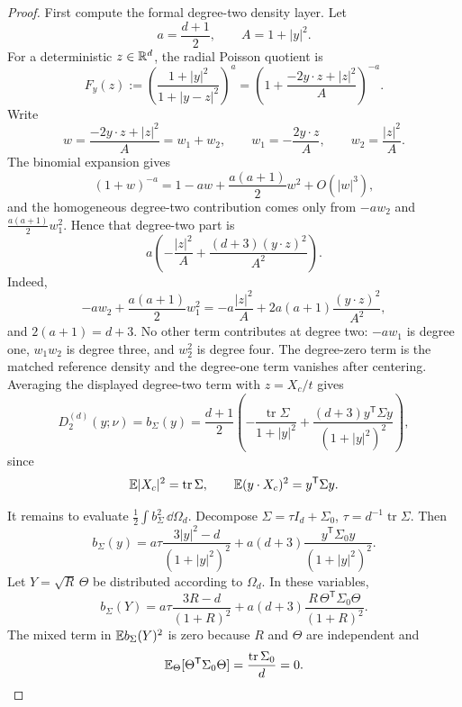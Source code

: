 \ifdefined\JFAArticleMain
{}
\else
\begin{proof}
First compute the formal degree-two density layer.  Let
\[
  a=\frac{d+1}{2},\qquad A=1+|y|^2 .
\]
For a deterministic \(z\in\mathbb{R}^d\), the radial Poisson quotient is
\[
F_y(z):=
\left(\frac{1+|y|^2}{1+|y-z|^2}\right)^a
=
\left(1+\frac{-2y\cdot z+|z|^2}{A}\right)^{-a}.
\]
Write
\[
  w=\frac{-2y\cdot z+|z|^2}{A}=w_1+w_2,\qquad
  w_1=-\frac{2y\cdot z}{A},\qquad
  w_2=\frac{|z|^2}{A}.
\]
The binomial expansion gives
\[
  (1+w)^{-a}=1-aw+\frac{a(a+1)}2w^2+O(|w|^3),
\]
and the homogeneous degree-two contribution comes only from \(-aw_2\) and
\(\frac{a(a+1)}2w_1^2\).  Hence that degree-two part is
\[
a\left(-\frac{|z|^2}{A}
+\frac{(d+3)(y\cdot z)^2}{A^2}\right).
\]
Indeed,
\[
  -aw_2+\frac{a(a+1)}2w_1^2
  =
  -a\frac{|z|^2}{A}
  +2a(a+1)\frac{(y\cdot z)^2}{A^2},
\]
and \(2(a+1)=d+3\).  No other term contributes at degree two:
\(-aw_1\) is degree one, \(w_1w_2\) is degree three, and \(w_2^2\) is degree
four.  The degree-zero term is the matched reference density and the
degree-one term vanishes after centering.  Averaging the displayed
degree-two term with \(z=X_c/t\) gives
\[
  D_2^{(d)}(y;\nu)=b_\Sigma(y)=
  \frac{d+1}{2}\left(
  -\frac{\operatorname{tr}\Sigma}{1+|y|^2}
  +\frac{(d+3)y^{\mathsf T}\Sigma y}{(1+|y|^2)^2}
  \right),
\]
since
\[
\mathbb{E} |X_c|^2=\operatorname{tr}\Sigma,\qquad
\mathbb{E} (y\cdot X_c)^2=y^{\mathsf T}\Sigma y .
\]

It remains to evaluate \(\frac12\int b_\Sigma^2\,\dd\Omega_d\).  Decompose
\(\Sigma=\tau I_d+\Sigma_0\), \(\tau=d^{-1}\operatorname{tr}\Sigma\).  Then
\[
b_\Sigma(y)=
a\tau\frac{3|y|^2-d}{(1+|y|^2)^2}
+a(d+3)\frac{y^{\mathsf T}\Sigma_0y}{(1+|y|^2)^2}.
\]
Let \(Y=\sqrt R\,\Theta\) be distributed according to \(\Omega_d\).  In these
variables,
\[
b_\Sigma(Y)=
a\tau\frac{3R-d}{(1+R)^2}
+a(d+3)\frac{R\,\Theta^{\mathsf T}\Sigma_0\Theta}{(1+R)^2}.
\]
The mixed term in \(\mathbb{E} b_\Sigma(Y)^2\) is zero because \(R\) and \(\Theta\)
are independent and
\[
\mathbb{E}_\Theta[\Theta^{\mathsf T}\Sigma_0\Theta]
=\frac{\operatorname{tr}\Sigma_0}{d}=0 .
\]


\end{proof}
